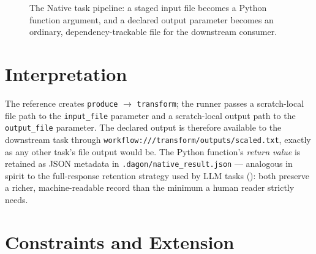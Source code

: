 \begin{figure}[h]
\centering
{}
\caption{The Native task pipeline: a staged input file becomes a Python
function argument, and a declared output parameter becomes an ordinary,
dependency-trackable file for the downstream consumer.}
\label{fig:native-task-flow}
\end{figure}

\section{Interpretation}

The reference creates \texttt{produce} $\to$ \texttt{transform}; the runner
passes a scratch-local file path to the \texttt{input\_file} parameter and a
scratch-local output path to the \texttt{output\_file} parameter. The
declared output is therefore available to the downstream task through
\texttt{workflow:///transform/outputs/scaled.txt}, exactly as any other
task's file output would be. The Python function's \emph{return value} is
retained as JSON metadata in \texttt{.dagon/native\_result.json} ---
analogous in spirit to the full-response retention strategy used by LLM
tasks (): both preserve a richer, machine-readable record
than the minimum a human reader strictly needs.

\section{Constraints and Extension}

